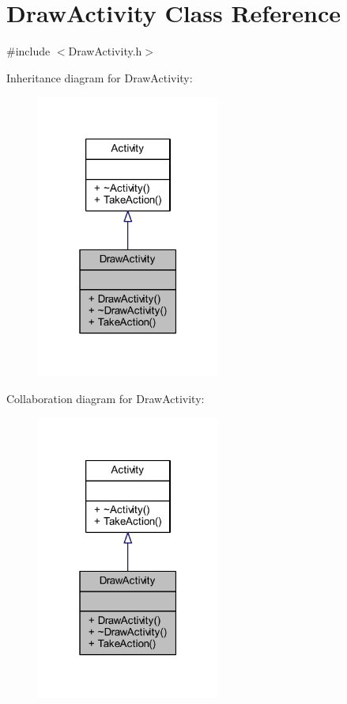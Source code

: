 \hypertarget{class_draw_activity}{}\section{Draw\+Activity Class Reference}
\label{class_draw_activity}


{\ttfamily \#include $<$Draw\+Activity.\+h$>$}



Inheritance diagram for Draw\+Activity\+:
\nopagebreak
\begin{figure}[H]
\begin{center}
\leavevmode
\includegraphics[width=171pt]{class_draw_activity__inherit__graph}
\end{center}
\end{figure}


Collaboration diagram for Draw\+Activity\+:
\nopagebreak
\begin{figure}[H]
\begin{center}
\leavevmode
\includegraphics[width=171pt]{class_draw_activity__coll__graph}
\end{center}
\end{figure}
